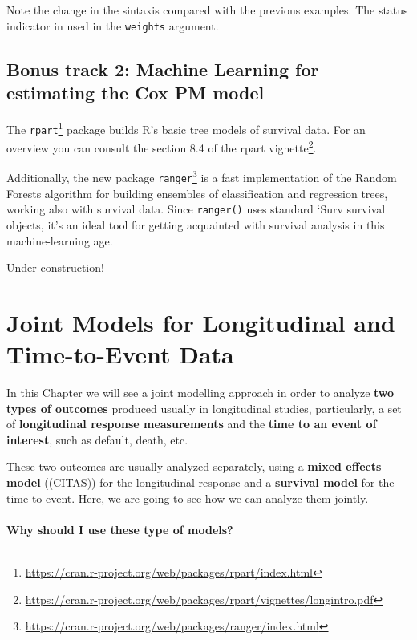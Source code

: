 \documentclass[]{book}
\let\rmarkdownfootnote\footnote%
\def\footnote{\protect\rmarkdownfootnote}
\renewcommand{\href}[2]{#2\footnote{\url{#1}}}
\theoremstyle{definition}
\theoremstyle{definition}
\theoremstyle{definition}
\theoremstyle{remark}
\let\BeginKnitrBlock\begin \let\EndKnitrBlock\end
\begin{document}
\BeginKnitrBlock{rmdhint_sestelo}
Note the change in the sintaxis compared with the previous examples. The
status indicator in used in the \texttt{weights} argument.
\EndKnitrBlock{rmdhint_sestelo}

\section{Bonus track 2: Machine Learning for estimating the Cox PM
model}\label{bonus-track-2-machine-learning-for-estimating-the-cox-pm-model}

The
\href{https://cran.r-project.org/web/packages/rpart/index.html}{\texttt{rpart}}
package builds R's basic tree models of survival data. For an overview
you can consult the section 8.4 of the rpart
\href{https://cran.r-project.org/web/packages/rpart/vignettes/longintro.pdf}{vignette}.

Additionally, the new package
\href{https://cran.r-project.org/web/packages/ranger/index.html}{\texttt{ranger}}
\citep{Wright:2017aa} is a fast implementation of the Random Forests
algorithm for building ensembles of classification and regression trees,
working also with survival data. Since \texttt{ranger()} uses standard
`Surv survival objects, it's an ideal tool for getting acquainted with
survival analysis in this machine-learning age.

Under construction!

\chapter{Joint Models for Longitudinal and Time-to-Event
Data}\label{joint-models-for-longitudinal-and-time-to-event-data}

In this Chapter we will see a joint modelling approach in order to
analyze \textbf{two types of outcomes} produced usually in longitudinal
studies, particularly, a set of \textbf{longitudinal response
measurements} and the \textbf{time to an event of interest}, such as
default, death, etc.

These two outcomes are usually analyzed separately, using a
\textbf{mixed effects model} ((CITAS)) for the longitudinal response and
a \textbf{survival model} for the time-to-event. Here, we are going to
see how we can analyze them jointly.

\subsubsection*{Why should I use these type of
models?}\label{why-should-i-use-these-type-of-models}
\end{document}
